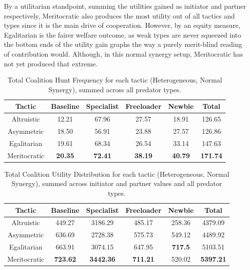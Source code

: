 \documentclass[12pt,a4paper]{report}
\begin{document}
	By a utilitarian standpoint, summing the utilities gained as initiator and partner respectively, Meritocratic also produces the most utility out of all tactics and types since it is the main drive of cooperation. However, by an equity measure, Egalitarian is the fairer welfare outcome, as weak types are never squeezed into the bottom ends of the utility gain graphs the way a purely merit-blind reading of contribution would. Although, in this normal synergy setup, Meritocratic has not yet produced that extreme. \\
	
	\begin{table}[H]
		\centering
		\begin{tabular}{|c|c|c|c|c|c|}
			\hline
			Tactic & Baseline & Specialist & Freeloader & Newbie & Total \\
			\hline
			Altruistic & 12.21 & 67.96 & 27.57 & 18.91 & 126.65 \\
			Asymmetric & 18.50 & 56.91 & 23.88 & 27.57 & 126.86 \\
			Egalitarian & 19.61 & 68.34 & 26.54 & 33.14 & 147.63 \\
			Meritocratic & \textbf{20.35} & \textbf{72.41} & \textbf{38.19} & \textbf{40.79} & \textbf{171.74}\\
			\hline
		\end{tabular}
		\caption{Total Coalition Hunt Frequency for each tactic (Heterogeneous, Normal Synergy), summed across all predator types.}
	\end{table}
	
	\begin{table}[H]
		\centering
		\begin{tabular}{|c|c|c|c|c|c|}
			\hline
			Tactic & Baseline & Specialist & Freeloader & Newbie & Total \\
			\hline
			Altruistic & 449.27 & 3186.29 & 485.17 & 258.36 & 4379.09 \\
			Asymmetric & 636.69 & 2728.38 & 575.73 & 549.12 & 4489.92 \\
			Egalitarian & 663.91 & 3074.15 & 647.95 & \textbf{717.5} & 5103.51 \\
			Meritocratic & \textbf{723.62} & \textbf{3442.36} & \textbf{711.21} & 520.02 & \textbf{5397.21}\\
			\hline
		\end{tabular}
		\caption{Total Coalition Utility Distribution for each tactic (Heterogeneous, Normal Synergy), summed across initiator and partner values and all predator types.}
	\end{table}
	
\end{document}
